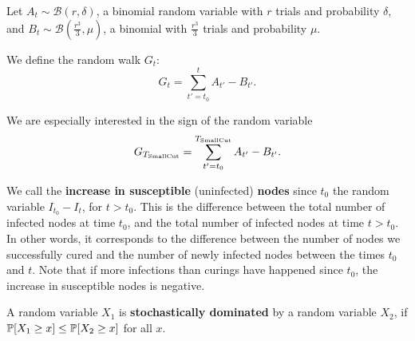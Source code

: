 \begin{definition}
Let $A_t \sim \mathcal{B}(r,\delta)$, a binomial random variable with $r$ trials and probability $\delta$, and $B_t \sim \mathcal{B}(\frac{r^3}{3},\mu)$, a binomial with $\frac{r^3}{3}$ trials and probability $\mu$. 

We define the random walk $G_t$:
\[ G_t = \sum_{t'=t_0}^t  A_{t'} - B_{t'}.\]
\end{definition}

We are especially interested in the sign of the random variable 
$$G_{T_{\rm Small Cut}} =\displaystyle \sum_{t'=t_0}^{T_{\rm Small Cut}} A_{t'} - B_{t'}.$$ 
\begin{definition}
We call the \textbf{increase in susceptible} (uninfected) \textbf{nodes} since $t_0$ the random variable $I_{t_0} - I_t$, for $t > t_0$. This is the difference between the total number of infected nodes at time $t_0$, and the total number of infected nodes at time $t > t_0$. In other words, it corresponds to the difference between the number of nodes we successfully cured and the number of newly infected nodes between the times $t_0$ and $t$. Note that if more infections than curings have happened since $t_0$, the increase in susceptible nodes is negative.
\end{definition}

\begin{definition}
A random variable $X_1$ is \textbf{stochastically dominated} by a random variable $X_2$, if $\mathbb{P}[X_1 \geq x] \leq \mathbb{P}[X_2 \geq x]$ for all $x$. 
\end{definition}

